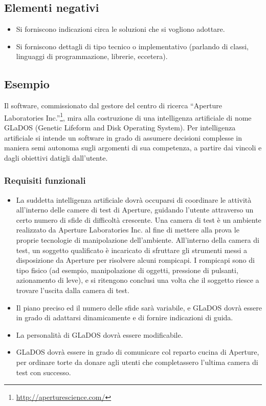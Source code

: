 \documentclass[a4paper,12pt]{report}
\begin{document}
\subsection*{Elementi negativi}
\begin{itemize}
	\item Si forniscono indicazioni circa le soluzioni che si vogliono adottare.
	\item Si forniscono dettagli di tipo tecnico o implementativo (parlando di classi, linguaggi di programmazione, librerie, eccetera).
\end{itemize}

\subsection*{Esempio}
Il software, commissionato dal gestore del centro di ricerca ``Aperture Laboratories Inc.''\footnote{\url{http://aperturescience.com/}}, mira alla costruzione di una intelligenza artificiale di nome GLaDOS (Genetic Lifeform and Disk Operating System).
%
Per intelligenza artificiale si intende un software in grado di assumere decisioni complesse in maniera semi autonoma sugli argomenti di sua competenza, a partire dai vincoli e dagli obiettivi datigli dall'utente.

\subsubsection{Requisiti funzionali}
\begin{itemize}
	\item La suddetta intelligenza artificiale dovrà occuparsi di coordinare le attività all'interno
delle camere di test di Aperture, guidando l'utente attraverso un certo numero di sfide di
difficoltà crescente. Una camera di test è un ambiente realizzato da Aperture Laboratories Inc. al
fine di mettere alla prova le proprie tecnologie di manipolazione dell'ambiente. All'interno della
camera di test, un soggetto qualificato è incaricato di sfruttare gli strumenti messi a
disposizione da Aperture per risolvere alcuni rompicapi. I rompicapi sono di tipo fisico (ad
esempio, manipolazione di oggetti, pressione di pulsanti, azionamento di leve), e si ritengono
conclusi una volta che il soggetto riesce a trovare l'uscita dalla camera di test.
	\item Il piano preciso ed il numero delle sfide sarà variabile, e GLaDOS dovrà essere in grado di adattarsi dinamicamente e di fornire indicazioni di guida.
	\item La personalità di GLaDOS dovrà essere modificabile.
	\item GLaDOS dovrà essere in grado di comunicare col reparto cucina di Aperture, per ordinare torte da donare agli utenti che completassero l'ultima camera di test con successo.
\end{itemize}
\end{document}
